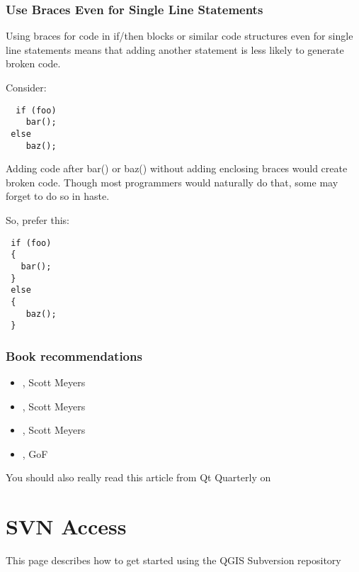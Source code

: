 \subsubsection{Use Braces Even for Single Line Statements}
Using braces for code in if/then blocks or similar code structures even for single line statements means that adding another 
statement is less likely to generate broken code.

Consider:

\begin{verbatim}
  if (foo)
    bar();
 else
    baz();
\end{verbatim}

Adding code after bar() or baz() without adding enclosing braces would create broken code.  Though most programmers would 
naturally do that, some may forget to do so in haste.

So, prefer this:

\begin{verbatim}
 if (foo)
 {
   bar();
 }
 else
 { 
    baz();
 } 
\end{verbatim}

\subsubsection{Book recommendations}

\begin{itemize} 
\item {}, Scott Meyers
\item {}, Scott Meyers
\item {}, Scott Meyers
\item {}, GoF
\end{itemize}

You should also really read this article from Qt Quarterly on 


\section{SVN Access}
This page describes how to get started using the QGIS Subversion repository

